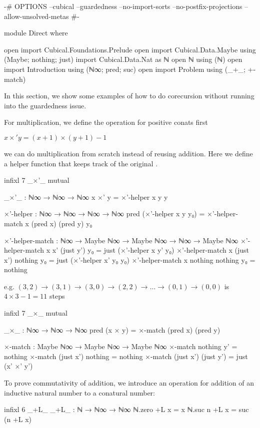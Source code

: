 \begin{code}[hide]
{-# OPTIONS --cubical --guardedness --no-import-sorts --no-postfix-projections --allow-unsolved-metas #-}

module Direct where

open import Cubical.Foundations.Prelude
open import Cubical.Data.Maybe using (Maybe; nothing; just)
import Cubical.Data.Nat as ℕ
open ℕ using (ℕ)
open import Introduction using (ℕ∞; pred; suc)
open import Problem using (_+_; +-match)
\end{code}
In this section, we show some examples of how to do corecursion without running
into the guardedness issue.

For multiplication, we define the operation for positive conats first

$x\times'y = (x+1)\times(y+1)-1$

we can do multiplication from scratch instead of reusing
addition. Here we define a helper function that keeps track of the original
.
\begin{code}[hide]
infixl 7 _×'_
mutual
\end{code}
\begin{code}
  _×'_ : ℕ∞ → ℕ∞ → ℕ∞
  x ×' y = ×'-helper x y y

  ×'-helper : ℕ∞ → ℕ∞ → ℕ∞ → ℕ∞
  pred (×'-helper x y y₀) =
    ×'-helper-match x (pred x) (pred y) y₀

  ×'-helper-match :
    ℕ∞ → Maybe ℕ∞ → Maybe ℕ∞ → ℕ∞ →
    Maybe ℕ∞
  ×'-helper-match x x' (just y') y₀ =
    just (×'-helper x y' y₀)
  ×'-helper-match x (just x') nothing y₀ =
    just (×'-helper x' y₀ y₀)
  ×'-helper-match x nothing nothing y₀ =
    nothing
\end{code}

e.g. $(3,2) \to (3,1) \to (3,0) \to (2,2) \to \dots \to (0,1) \to (0,0)$ is $4
\times 3 - 1 = 11$ steps

\begin{code}[hide]
infixl 7 _×_
mutual
\end{code}
\begin{code}
  _×_ : ℕ∞ → ℕ∞ → ℕ∞
  pred (x × y) = ×-match (pred x) (pred y)

  ×-match : Maybe ℕ∞ → Maybe ℕ∞ → Maybe ℕ∞
  ×-match nothing    y'         = nothing
  ×-match (just x')  nothing    = nothing
  ×-match (just x')  (just y')  = just (x' ×' y')
\end{code}

To prove commutativity of addition, we introduce an operation for addition of an
inductive natural number to a conatural number:
\begin{code}
infixl 6 _+L_
_+L_ : ℕ → ℕ∞ → ℕ∞
ℕ.zero +L x = x
ℕ.suc n +L x = suc (n +L x)
\end{code}

